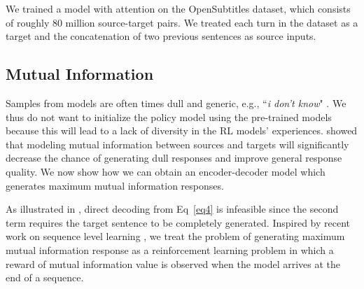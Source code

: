 We trained a \sts model with attention \cite{bahdanau2014neural} on the OpenSubtitles dataset, which consists of roughly 80 million source-target pairs. 
We treated each turn in the dataset as a target and the concatenation of two previous sentences as source inputs. 
\subsection{Mutual Information}
Samples from \sts models are often times dull and generic, e.g., ``{\it i don't know}" \cite{li2015diversity}.
We thus do not want to initialize the policy model using the pre-trained \sts models because this will lead to a lack of diversity in the RL models' experiences. 
  showed that modeling mutual information between sources and targets will significantly decrease the chance of generating dull responses and improve  general response quality.
We now show how we can obtain an encoder-decoder model which generates maximum mutual information responses. 


 

As illustrated in , direct decoding from Eq~\ref{eq4} is infeasible since the second term 
 requires
 the target sentence to be  completely generated.
 Inspired by recent work on sequence level learning \cite{ranzato2015sequence}, we treat the problem of 
generating maximum mutual information response 
as a reinforcement learning problem in which a reward of mutual information value is observed when the model arrives at the end of  a sequence. 

